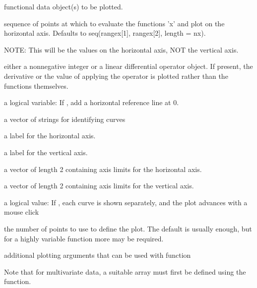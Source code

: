 \begin{Arguments}
\begin{ldescription}
\item[\code{x}] functional data object(s) to be plotted.

\item[\code{y}] sequence of points at which to evaluate the functions 'x' and plot
on the horizontal axis.  Defaults to seq(rangex[1], rangex[2],
length = nx).

NOTE:  This will be the values on the horizontal axis, NOT the
vertical axis.  

\item[\code{Lfdobj}] either a nonnegative integer or a linear differential operator
object. If present, the derivative or the value of applying the
operator is plotted rather than the functions themselves.

\item[\code{href}] a logical variable:  If , add a horizontal reference line
at 0.  

\item[\code{titles}] a vector of strings for identifying curves

\item[\code{xlab}] a label for the horizontal axis.

\item[\code{ylab}] a label for the vertical axis.

\item[\code{xlim}] a vector of length 2 containing axis limits for the horizontal axis.

\item[\code{ylim}] a vector of length 2 containing axis limits for the vertical axis.

\item[\code{ask}] a logical value:  If , each curve is shown separately, and
the plot advances with a mouse click

\item[\code{nx}] the number of points to use to define the plot.  The default is
usually enough, but for a highly variable function more may be
required.

\item[\code{... }] additional plotting arguments that can be used with function

\end{ldescription}
\end{Arguments}
\begin{Details}\relax
Note that for multivariate data, a
suitable array must first be defined using the  function.
\end{Details}
